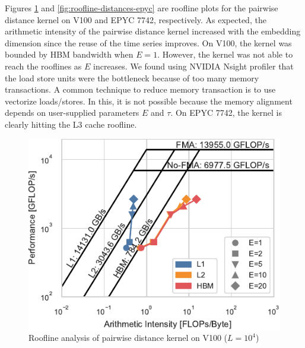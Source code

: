 \documentclass[sigconf]{acmart}
\begin{document}

Figures \ref{fig:roofline-distances-v100} and \ref{fig:roofline-distances-epyc}
are roofline plots for the pairwise distance kernel on V100 and EPYC 7742,
respectively. As expected, the arithmetic intensity of the pairwise distance
kernel increased with the embedding dimension since the reuse of the time
series improves. On V100, the kernel was bounded by HBM bandwidth when $E=1$.
However, the kernel was not able to reach the rooflines as $E$ increases. We
found using NVIDIA Nsight profiler that the load store units were the
bottleneck because of too many memory transactions. A common technique to
reduce memory transaction is to use vectorize loads/stores. In this, it is not
possible because the memory alignment depends on user-supplied parameters $E$
and $\tau$. On EPYC 7742, the kernel is clearly hitting the L3 cache roofline.

\begin{figure}
    \centering
    \includegraphics{figs/roofline_distances_v100}
    \caption{Roofline analysis of pairwise distance kernel on V100 ($L=10^4$)}%
    \label{fig:roofline-distances-v100}
\end{figure}
\end{document}
